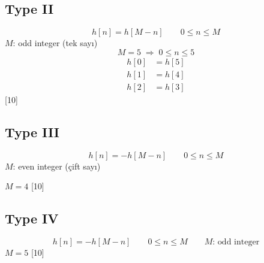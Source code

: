 \documentclass[11pt,a4paper]{article}
\begin{document}
\subsection{Type II}
\[ h[n] = h[M-n] \qquad 0 \le n \le M \]
$M$: odd integer (tek sayı)
\[ M = 5 \;\Rightarrow\; 0 \le n \le 5 \]
\begin{align*}
h[0] &= h[5]\\
h[1] &= h[4]\\
h[2] &= h[3]
\end{align*}
[10]

\subsection{Type III}
\[ h[n] = -h[M-n] \qquad 0 \le n \le M \]
$M$: even integer (çift sayı)

$M = 4$
[10]

\subsection{Type IV}
\[ h[n] = -h[M-n] \qquad 0 \le n \le M \qquad M\text{: odd integer} \]
$M = 5$
[10]
\end{document}
